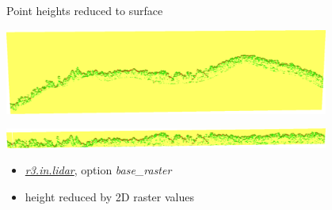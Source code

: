 \documentclass[xcolor={dvipsnames,usenames},beamer,aspectratio=169]{beamer}
\newcommand{\gmodule}[1]{\href{http://grass.osgeo.org/grass71/manuals/#1.html}{\emph{#1}}}
\begin{document}
\begin{frame}{Point heights reduced to surface}

\begin{center}
  \includegraphics[width=0.8\textwidth]{features/rast3_real}

  \bigskip

  \includegraphics[width=0.8\textwidth]{features/rast3_base}
\end{center}

\begin{itemize}
  \item \gmodule{r3.in.lidar}, option \textit{base\_raster}
  \item height reduced by 2D raster values
\end{itemize}

\end{frame}
\end{document}

